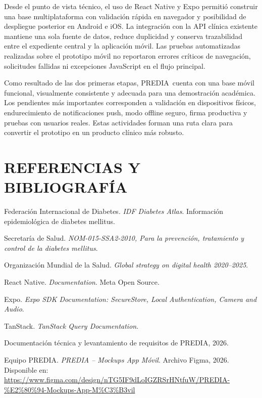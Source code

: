 \documentclass[12pt,letterpaper]{report}
\newcommand{\projectname}{PREDIA}
\begin{document}
Desde el punto de vista técnico, el uso de React Native y Expo permitió construir una base multiplataforma con validación rápida en navegador y posibilidad de despliegue posterior en Android e iOS. La integración con la API clínica existente mantiene una sola fuente de datos, reduce duplicidad y conserva trazabilidad entre el expediente central y la aplicación móvil. Las pruebas automatizadas realizadas sobre el prototipo móvil no reportaron errores críticos de navegación, solicitudes fallidas ni excepciones JavaScript en el flujo principal.

Como resultado de las dos primeras etapas, \projectname\ cuenta con una base móvil funcional, visualmente consistente y adecuada para una demostración académica. Los pendientes más importantes corresponden a validación en dispositivos físicos, endurecimiento de notificaciones push, modo offline seguro, firma productiva y pruebas con usuarios reales. Estas actividades forman una ruta clara para convertir el prototipo en un producto clínico más robusto.

\chapter*{REFERENCIAS Y BIBLIOGRAFÍA}

\begin{enumerate}[label={[\arabic*]}]
  \item Federación Internacional de Diabetes. \textit{IDF Diabetes Atlas}. Información epidemiológica de diabetes mellitus.
  \item Secretaría de Salud. \textit{NOM-015-SSA2-2010, Para la prevención, tratamiento y control de la diabetes mellitus}.
  \item Organización Mundial de la Salud. \textit{Global strategy on digital health 2020--2025}.
  \item React Native. \textit{Documentation}. Meta Open Source.
  \item Expo. \textit{Expo SDK Documentation: SecureStore, Local Authentication, Camera and Audio}.
  \item TanStack. \textit{TanStack Query Documentation}.
  \item Documentación técnica y levantamiento de requisitos de PREDIA, 2026.
  \item Equipo PREDIA. \textit{PREDIA -- Mockups App Móvil}. Archivo Figma, 2026. Disponible en: \url{https://www.figma.com/design/nTG5IF9dLoIGZRSrHNtfuW/PREDIA-%E2%80%94-Mockups-App-M%C3%B3vil}
\end{enumerate}
\end{document}
